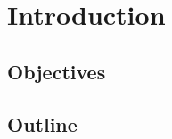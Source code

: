 \chapter{Introduction}\label{ch:introduction}

\section{Objectives}\label{sec:objectives}

\section{Outline}\label{sec:outline}